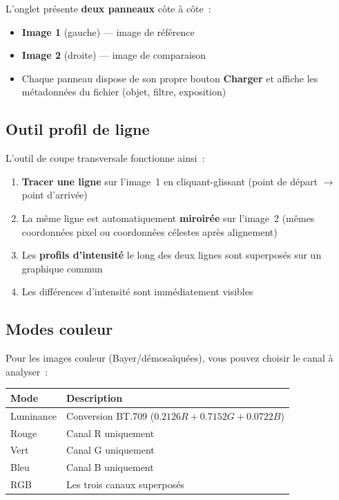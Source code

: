 \documentclass[a4paper,11pt]{article}
\begin{document}
L'onglet pr\'{e}sente \textbf{deux panneaux} c\^{o}te \`{a} c\^{o}te~:

\begin{itemize}
    \item \textbf{Image 1} (gauche) --- image de r\'{e}f\'{e}rence
    \item \textbf{Image 2} (droite) --- image de comparaison
    \item Chaque panneau dispose de son propre bouton \textbf{Charger} et affiche les m\'{e}tadonn\'{e}es du fichier (objet, filtre, exposition)
\end{itemize}

\subsection{Outil profil de ligne}

L'outil de coupe transversale fonctionne ainsi~:

\begin{enumerate}
    \item \textbf{Tracer une ligne} sur l'image~1 en cliquant-glissant (point de d\'{e}part $\rightarrow$ point d'arriv\'{e}e)
    \item La m\^{e}me ligne est automatiquement \textbf{miroir\'{e}e} sur l'image~2 (m\^{e}mes coordonn\'{e}es pixel ou coordonn\'{e}es c\'{e}lestes apr\`{e}s alignement)
    \item Les \textbf{profils d'intensit\'{e}} le long des deux lignes sont superpos\'{e}s sur un graphique commun
    \item Les diff\'{e}rences d'intensit\'{e} sont imm\'{e}diatement visibles
\end{enumerate}

\subsection{Modes couleur}

Pour les images couleur (Bayer/d\'{e}mosa\"{i}qu\'{e}es), vous pouvez choisir le canal \`{a} analyser~:

\begin{center}
\begin{tabularx}{0.7\textwidth}{l X}
\toprule
\textbf{Mode} & \textbf{Description} \\
\midrule
Luminance & Conversion BT.709 ($0.2126R + 0.7152G + 0.0722B$) \\
Rouge & Canal R uniquement \\
Vert & Canal G uniquement \\
Bleu & Canal B uniquement \\
RGB & Les trois canaux superpos\'{e}s \\
\bottomrule
\end{tabularx}
\end{center}
\end{document}
